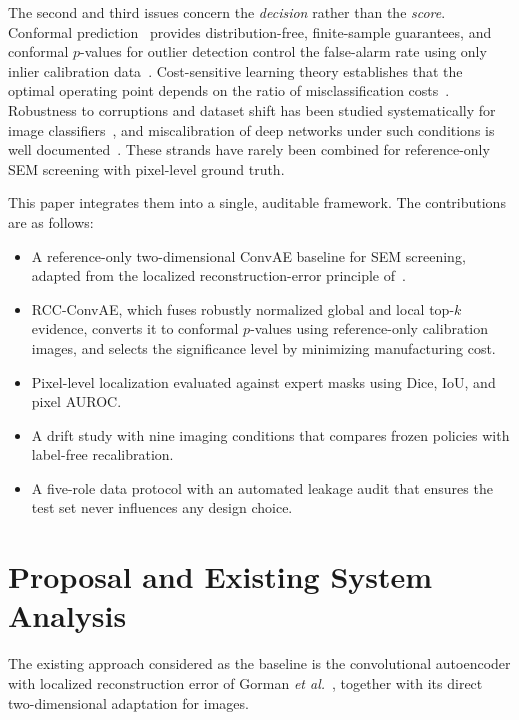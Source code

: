 \documentclass[conference]{IEEEtran}
\begin{document}
The second and third issues concern the \emph{decision} rather than the \emph{score}. Conformal prediction~\cite{vovk2005,angelopoulos2021} provides distribution-free, finite-sample guarantees, and conformal $p$-values for outlier detection control the false-alarm rate using only inlier calibration data~\cite{bates2023,laxhammar2015}. Cost-sensitive learning theory establishes that the optimal operating point depends on the ratio of misclassification costs~\cite{elkan2001}. Robustness to corruptions and dataset shift has been studied systematically for image classifiers~\cite{hendrycks2019,rabanser2019}, and miscalibration of deep networks under such conditions is well documented~\cite{guo2017}. These strands have rarely been combined for reference-only SEM screening with pixel-level ground truth.

This paper integrates them into a single, auditable framework. The contributions are as follows:
\begin{itemize}
\item A reference-only two-dimensional ConvAE baseline for SEM screening, adapted from the localized reconstruction-error principle of~\cite{gorman2023}.
\item RCC-ConvAE, which fuses robustly normalized global and local top-$k$ evidence, converts it to conformal $p$-values using reference-only calibration images, and selects the significance level by minimizing manufacturing cost.
\item Pixel-level localization evaluated against expert masks using Dice, IoU, and pixel AUROC.
\item A drift study with nine imaging conditions that compares frozen policies with label-free recalibration.
\item A five-role data protocol with an automated leakage audit that ensures the test set never influences any design choice.
\end{itemize}

\section{Proposal and Existing System Analysis}
The existing approach considered as the baseline is the convolutional autoencoder with localized reconstruction error of Gorman \emph{et al.}~\cite{gorman2023}, together with its direct two-dimensional adaptation for images.
\end{document}

